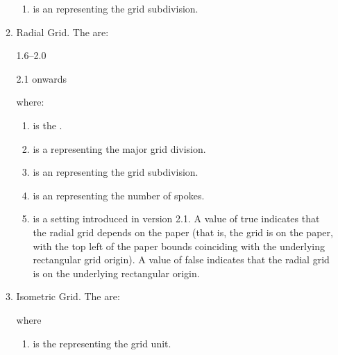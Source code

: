 \begin{numbered}
\begin{enumerate}
\begin{enumerate}
\begin{enumerate}
       \item {} is an  representing the grid subdivision.

     \end{enumerate}

     \item Radial Grid. The  are:
    \begin{jdrversion}{1.6--2.0}
    \begin{syntaxline}
       
    \end{syntaxline}
    \end{jdrversion}
    \begin{jdrversion}{2.1 onwards}
    \begin{syntaxline}
        
    \end{syntaxline}
    \end{jdrversion}
    where:
      \begin{enumerate}
       \item {} is the .

       \item {} is a  representing the major grid division.

       \item {} is an  representing the grid subdivision.

       \item {} is an  representing the number of spokes.

       \item {} is a  setting
       introduced in version 2.1. A value of true indicates that the
       radial grid depends on the paper (that is, the grid is
        on the paper, with the top left of the paper
       bounds coinciding with the underlying rectangular grid origin). 
       A value of false indicates that the radial grid is  
       on the underlying rectangular origin.
      \end{enumerate}

     \item Isometric Grid. The  are:
    \begin{syntaxline}
      
    \end{syntaxline}
    where
      \begin{enumerate}
       \item {} is the  representing the grid unit.


\end{enumerate}
\end{enumerate}
\end{enumerate}
\end{numbered}

